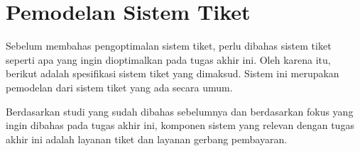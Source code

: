 \section{Pemodelan Sistem Tiket}
\label{apx:analisis-kebutuhan}

Sebelum membahas pengoptimalan sistem tiket, perlu dibahas sistem tiket seperti apa yang ingin dioptimalkan pada tugas akhir ini. Oleh karena itu, berikut adalah spesifikasi sistem tiket yang dimaksud. Sistem ini merupakan pemodelan dari sistem tiket yang ada secara umum.

Berdasarkan studi yang sudah dibahas sebelumnya dan berdasarkan fokus yang ingin dibahas pada tugas akhir ini, komponen sistem yang relevan dengan tugas akhir ini adalah layanan tiket dan layanan gerbang pembayaran.




